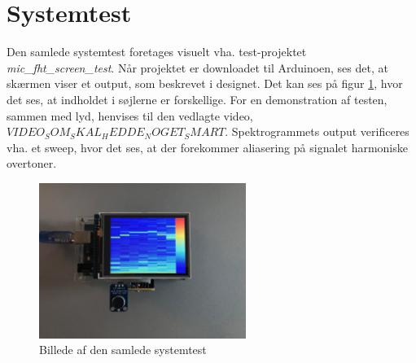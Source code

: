 \section{Systemtest}
Den samlede systemtest foretages visuelt vha. test-projektet \textit{mic\_fht\_screen\_test}. 
Når projektet er downloadet til Arduinoen, ses det, at skærmen viser et output, som beskrevet i designet.
Det kan ses på figur \ref{fig:sys_test1}, hvor det ses, at indholdet i søjlerne er forskellige. 
For en demonstration af testen, sammen med lyd, henvises til den vedlagte video, $VIDEO_SOM_SKAL_HEDDE_NOGET_SMART$. 
Spektrogrammets output verificeres vha. et sweep, hvor det ses, at der forekommer aliasering på signalet harmoniske overtoner. 

\begin{figure}[H]
	\center
	\includegraphics[width = 0.6\textwidth]{Figur/IMG_2470.JPG}
	\caption{Billede af den samlede systemtest}
	\label{fig:sys_test1}
\end{figure}